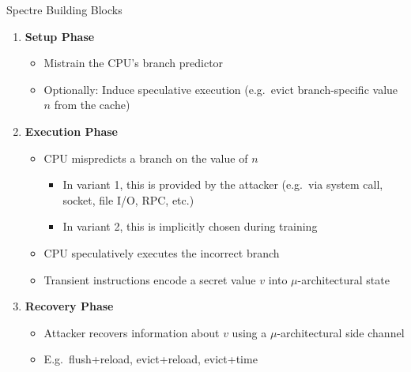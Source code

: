 \documentclass[10pt, dvipsnames, aspectratio=169]{beamer}
\begin{document}
\begin{frame}[c]{Spectre Building Blocks}
  \begin{enumerate}
    \item {\bf\color{blue}Setup Phase}
    \begin{itemize}
      \item Mistrain the CPU's branch predictor
      \item Optionally: Induce speculative execution (e.g.~evict branch-specific value $n$ from the cache)
    \end{itemize}

    \vfill
    \item {\bf\color{orange}Execution Phase}
    \begin{itemize}
      \item CPU mispredicts a branch on the value of $n$
      \begin{itemize}
        \item In variant 1, this is provided by the attacker (e.g.~via system call, socket, file I/O, RPC, etc.)
        \item In variant 2, this is implicitly chosen during training
      \end{itemize}
      \item CPU speculatively executes the incorrect branch
      \item Transient instructions encode a secret value $v$ into $\mu$-architectural state
    \end{itemize}

    \vfill
    \item {\bf\color{green}Recovery Phase}
    \begin{itemize}
      \item Attacker recovers information about $v$ using a $\mu$-architectural side channel
      \item E.g.~flush+reload, evict+reload, evict+time
    \end{itemize}
  \end{enumerate}
\end{frame}
\end{document}
